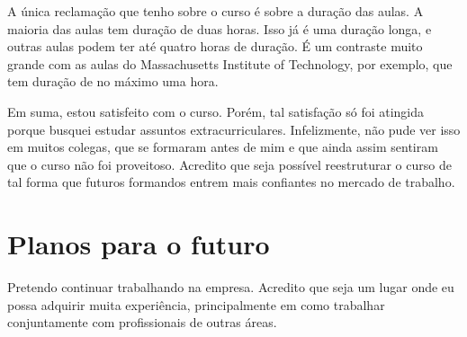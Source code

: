 A única reclamação que tenho sobre o curso é sobre a duração das aulas. A maioria das aulas tem duração de duas horas. 
Isso já é uma duração longa, e outras aulas podem ter até quatro horas de duração. É um contraste muito grande com as aulas do Massachusetts 
Institute of Technology, 
por exemplo, que tem duração de no máximo uma hora.

Em suma, estou satisfeito com o curso. Porém, tal satisfação só foi atingida porque busquei estudar assuntos extracurriculares. 
Infelizmente, não pude ver isso em muitos colegas, que se formaram antes de mim e que ainda assim sentiram que o curso não foi proveitoso. 
Acredito que seja possível reestruturar o curso de tal forma que futuros formandos entrem mais confiantes no mercado de trabalho.


\section{Planos para o futuro}

Pretendo continuar trabalhando na empresa. Acredito que seja um lugar onde eu possa adquirir muita experiência,
principalmente em como trabalhar conjuntamente com profissionais de outras áreas.
